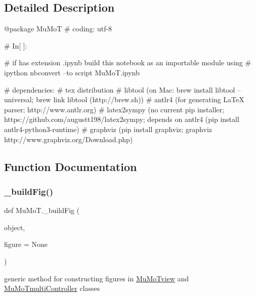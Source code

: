 \subsection{Detailed Description}
\begin{DoxyVerb}@package MuMoT
# coding: utf-8

# In[ ]:

# if has extension .ipynb build this notebook as an importable module using
# ipython nbconvert --to script MuMoT.ipynb

# dependencies:
#  tex distribution
#  libtool (on Mac: brew install libtool --universal; brew link libtool (http://brew.sh))
#  antlr4 (for generating LaTeX parser; http://www.antlr.org)
#  latex2sympy (no current pip installer; https://github.com/augustt198/latex2sympy; depends on antlr4 (pip install antlr4-python3-runtime)
#  graphviz (pip install graphviz; graphviz http://www.graphviz.org/Download.php)
\end{DoxyVerb}
 

\subsection{Function Documentation}
\mbox{\label{namespace_mu_mo_t_a4cf5ca1427b0999c933587bfaa89936d}} 
\subsubsection{\texorpdfstring{\+\_\+build\+Fig()}{\_buildFig()}}
{\footnotesize\ttfamily def Mu\+Mo\+T.\+\_\+build\+Fig (\begin{DoxyParamCaption}\item[{}]{object,  }\item[{}]{figure = {\ttfamily None} }\end{DoxyParamCaption})\hspace{0.3cm}{\ttfamily [private]}}



generic method for constructing figures in \hyperlink{class_mu_mo_t_1_1_mu_mo_tview}{Mu\+Mo\+Tview} and \hyperlink{class_mu_mo_t_1_1_mu_mo_tmulti_controller}{Mu\+Mo\+Tmulti\+Controller} classes 

\mbox{\label{namespace_mu_mo_t_a276566fb102dd4e4bf32a9ba4fb8a09b}} 
